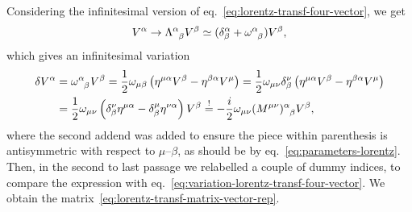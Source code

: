 \begin{mdframed}
\begin{innerproof}
    Considering the infinitesimal version of eq.~\eqref{eq:lorentz-transf-four-vector}, we get
    \begin{equation*}
        V^\alpha \to \tensor{\Lambda}{^\alpha_\beta} V^\beta \simeq (\delta^\alpha_\beta + \tensor{\omega}{^\alpha_\beta}) V^\beta,
    \end{equation*}
    which gives an infinitesimal variation
    \begin{equation*}
    \begin{split}
        \delta V^\alpha &= \tensor{\omega}{^\alpha_\beta} V^\beta = \frac{1}{2} \omega_{\mu\beta} \left( \eta^{\mu\alpha} V^\beta - \eta^{\beta\alpha} V^\mu \right) = \frac{1}{2} \omega_{\mu\nu} \delta^\nu_\beta \left( \eta^{\mu\alpha} V^\beta - \eta^{\beta\alpha} V^\mu \right) \\
        &= \frac{1}{2} \omega_{\mu\nu} \left( \delta^\nu_\beta \eta^{\mu\alpha} - \delta^\mu_\beta \eta^{\nu\alpha} \right) V^\beta \overset{!}{=} - \frac{i}{2} \omega_{\mu\nu} \tensor{(M^{\mu\nu})}{^\alpha_\beta} V^\beta ,
    \end{split}
    \end{equation*}
    where the second addend was added to ensure the piece within parenthesis is antisymmetric with respect to $\mu$--$\beta$, as should be by eq.~\eqref{eq:parameters-lorentz}. Then, in the second to last passage we relabelled a couple of dummy indices, to compare the expression with eq.~\eqref{eq:variation-lorentz-transf-four-vector}. We obtain the matrix~\eqref{eq:lorentz-transf-matrix-vector-rep}.
\end{innerproof}
\end{mdframed}

